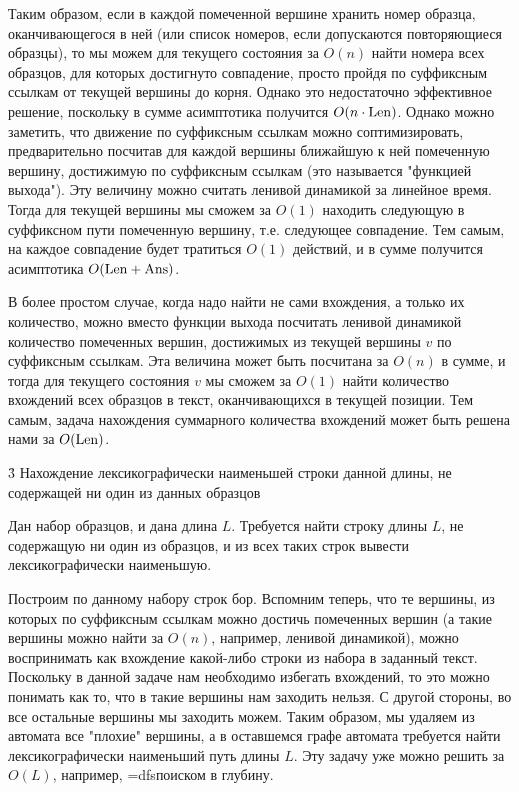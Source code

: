 Таким образом, если в каждой помеченной вершине хранить номер образца, оканчивающегося в ней (или список номеров, если допускаются повторяющиеся образцы), то мы можем для текущего состояния за $O (n)$ найти номера всех образцов, для которых достигнуто совпадение, просто пройдя по суффиксным ссылкам от текущей вершины до корня. Однако это недостаточно эффективное решение, поскольку в сумме асимптотика получится $O (n \cdot {\rm Len})$. Однако можно заметить, что движение по суффиксным ссылкам можно соптимизировать, предварительно посчитав для каждой вершины ближайшую к ней помеченную вершину, достижимую по суффиксным ссылкам (это называется "функцией выхода"). Эту величину можно считать ленивой динамикой за линейное время. Тогда для текущей вершины мы сможем за $O (1)$ находить следующую в суффиксном пути помеченную вершину, т.е. следующее совпадение. Тем самым, на каждое совпадение будет тратиться $O (1)$ действий, и в сумме получится асимптотика $O ({\rm Len + Ans})$.

В более простом случае, когда надо найти не сами вхождения, а только их количество, можно вместо функции выхода посчитать ленивой динамикой количество помеченных вершин, достижимых из текущей вершины $v$ по суффиксным ссылкам. Эта величина может быть посчитана за $O (n)$ в сумме, и тогда для текущего состояния $v$ мы сможем за $O (1)$ найти количество вхождений всех образцов в текст, оканчивающихся в текущей позиции. Тем самым, задача нахождения суммарного количества вхождений может быть решена нами за $O ({\rm Len})$.


\h3{ Нахождение лексикографически наименьшей строки данной длины, не содержащей ни один из данных образцов }

Дан набор образцов, и дана длина $L$. Требуется найти строку длины $L$, не содержащую ни один из образцов, и из всех таких строк вывести лексикографически наименьшую.

Построим по данному набору строк бор. Вспомним теперь, что те вершины, из которых по суффиксным ссылкам можно достичь помеченных вершин (а такие вершины можно найти за $O (n)$, например, ленивой динамикой), можно воспринимать как вхождение какой-либо строки из набора в заданный текст. Поскольку в данной задаче нам необходимо избегать вхождений, то это можно понимать как то, что в такие вершины нам заходить нельзя. С другой стороны, во все остальные вершины мы заходить можем. Таким образом, мы удаляем из автомата все "плохие" вершины, а в оставшемся графе автомата требуется найти лексикографически наименьший путь длины $L$. Эту задачу уже можно решить за $O (L)$, например, \algohref=dfs{поиском в глубину}.


